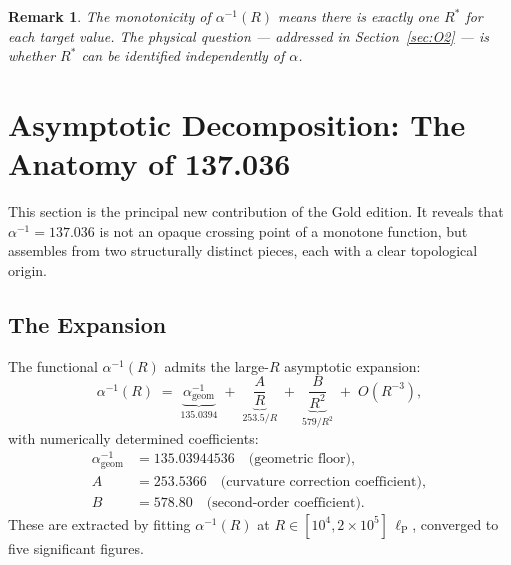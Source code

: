 \documentclass[12pt,a4paper]{article}
\newcommand{\lP}{\ell_{\mathrm{P}}}
\newcommand{\ai}{\alpha^{-1}}
\newcommand{\floor}{\ai_{\mathrm{geom}}}
\newtheorem{remark}{Remark}[section]
\begin{document}
\begin{remark}
The monotonicity of $\ai(R)$ means there is exactly
one $R^*$ for each target value.
The physical question --- addressed in
Section~\ref{sec:O2} --- is whether $R^*$ can be
identified independently of $\alpha$.
\end{remark}

\section{Asymptotic Decomposition: The Anatomy of 137.036}
\label{sec:asymptotic}

This section is the principal new contribution of
the Gold edition.
It reveals that $\alpha^{-1} = 137.036$ is not
an opaque crossing point of a monotone function,
but assembles from two structurally distinct
pieces, each with a clear topological origin.

\subsection{The Expansion}

\begin{Tbox}
\label{thm:asymp}
The functional $\ai(R)$ admits the large-$R$
asymptotic expansion:
\begin{equation}
\boxed{
  \ai(R) \;=\;
  \underbrace{\floor}_{\displaystyle 135.0394}
  \;+\;
  \underbrace{\frac{A}{R}}_{\displaystyle 253.5/R}
  \;+\;
  \underbrace{\frac{B}{R^2}}_{\displaystyle 579/R^2}
  \;+\; O(R^{-3}),
}
\label{eq:asymp}
\end{equation}
with numerically determined coefficients:
\begin{align*}
  \floor &= 135.03944536
    \quad\text{(geometric floor)},\\
  A &= 253.5366
    \quad\text{(curvature correction coefficient)},\\
  B &= 578.80
    \quad\text{(second-order coefficient)}.
\end{align*}
These are extracted by fitting $\ai(R)$ at
$R \in [10^4, 2\times 10^5]\,\lP$,
converged to five significant figures.
\end{Tbox}
\end{document}

